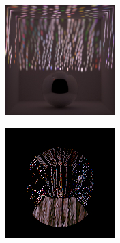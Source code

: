 \begin{figure}[]
\begin{subfigure}{\textwidth}
\begin{subfigure}{0.19\textwidth}
            \centering
            \includegraphics[width=\textwidth]{images/04-experiment03/ball_dof/wood/stats_proj.jpg}
            \caption*{}
        \end{subfigure}
        \hfill
        \begin{subfigure}{0.19\textwidth}
            \centering
            \includegraphics[width=\textwidth]{images/04-experiment03/ball_dof/wood/pixel_im.jpg}

\end{subfigure}
\end{subfigure}
\end{figure}
